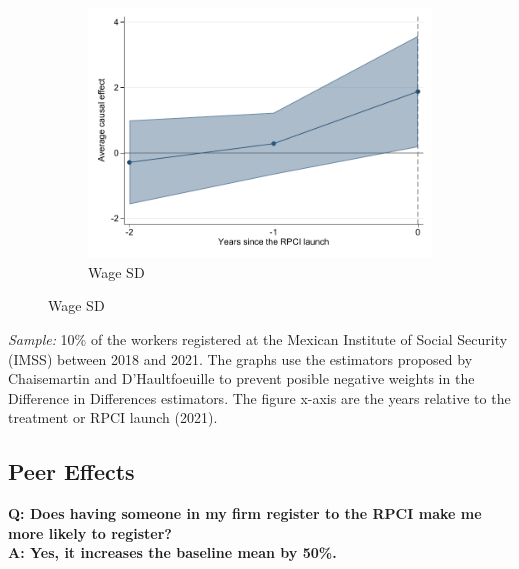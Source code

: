 \documentclass[oneside,11pt]{article}
\begin{document}
\begin{figure}[H]
    \caption{Event studies - RPCI effect on wage volatility}
    \label{event_study_sal_cierre_sd_yr}
    \begin{center}
    
    \begin{subfigure}{0.49\textwidth}
    \caption{Wage SD}
    \includegraphics[width=\textwidth]{04_Figures/muestra_10porciento/event_study_sal_cierre_sd_yr_chaisemartin.pdf}
    \end{subfigure}
    
    \end{center}
\end{figure}
\scriptsize{
\noindent \textit{Sample:} 10\% of the workers registered at the Mexican Institute of Social Security (IMSS) between 2018 and 2021. The graphs use the estimators proposed by Chaisemartin and D'Haultfoeuille to prevent posible negative weights in the Difference in Differences estimators. The figure x-axis are the years relative to the treatment or RPCI launch (2021).
}

\normalsize

\clearpage

\subsection{Peer Effects} \label{peer}

\textbf{Q: Does having someone in my firm register to the RPCI make me more likely to register?}
\\
\textbf{A: Yes, it increases the baseline mean by 50\%.}
\end{document}
